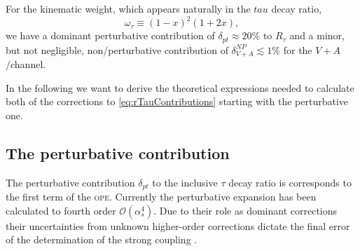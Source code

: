 \documentclass[../../index.tex]{subfiles}
\begin{document}
For the kinematic weight, which appears naturally in the \(tau\) decay ratio,
\begin{equation}
  \omega_\tau \equiv (1-x)^2(1+2x),
\end{equation}
we have a dominant perturbative contribution of \(\delta_{pt} \approx 20\%\) to
\(R_\tau\) \cite{Pich2013} and a minor, but not negligible, non\-/perturbative
contribution of \(\delta_{V+A}^{NP} \lesssim 1\% \) \cite{Jamin2013} for the
\(V+A\)\-/channel.

In the following we want to derive the theoretical expressions needed to
calculate both of the corrections to \cref{eq:rTauContributions} starting with
the perturbative one.


\subsection{The perturbative contribution}
The perturbative contribution \(\delta_{pt}\) to the inclusive \(\tau\) decay
ratio is corresponds to the first term of the \textsc{ope}. Currently the
perturbative expansion has been calculated to fourth order
\(\mathcal{O}(\alpha_s^4)\). Due to their role as dominant corrections their
uncertainties from unknown higher-order corrections dictate the final error of
the determination of the strong coupling \cite{Pich2016}.
\end{document}
